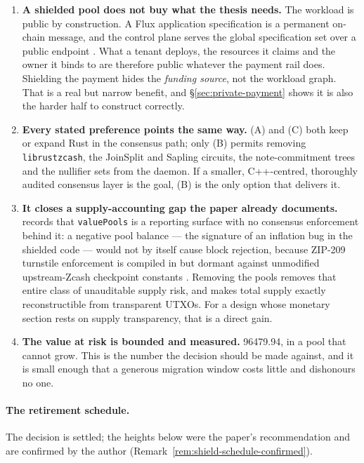 \begin{enumerate}
  \item \textbf{A shielded pool does not buy what the thesis needs.} The workload is public by
  construction. A Flux application specification is a permanent on-chain message, and the
  control plane serves the global specification set over a public endpoint
  . What a tenant deploys, the
  resources it claims and the owner it binds to are therefore public whatever the payment rail does.
  Shielding the payment hides the \emph{funding source}, not the workload graph. That is a real but
  narrow benefit, and \S\ref{sec:private-payment} shows it is also the harder half to construct
  correctly.
  \item \textbf{Every stated preference points the same way.} (A) and (C) both keep or expand Rust in
  the consensus path; only (B) permits removing \texttt{librustzcash}, the JoinSplit and Sapling
  circuits, the note-commitment trees and the nullifier sets from the daemon. If a smaller,
  C++-centred, thoroughly audited consensus layer is the goal, (B) is the only option that delivers
  it.
  \item \textbf{It closes a supply-accounting gap the paper already documents.}
   records that \texttt{valuePools} is a reporting surface with no
  consensus enforcement behind it: a negative pool balance --- the signature of an inflation bug in
  the shielded code --- would not by itself cause block rejection, because ZIP-209 turnstile
  enforcement is compiled in but dormant against unmodified upstream-Zcash checkpoint constants
  . Removing the pools removes that entire class of
  unauditable supply risk, and makes total supply exactly reconstructible from transparent UTXOs.
  For a design whose monetary section rests on supply transparency, that is a direct gain.
  \item \textbf{The value at risk is bounded and measured.} \num{96479.94}\flux, in a pool that
  cannot grow. This is the number the decision should be made against, and it is small enough that
  a generous migration window costs little and dishonours no one.
\end{enumerate}

\paragraph{The retirement schedule.} The decision is settled; the heights below were the paper's
recommendation and are confirmed by the author (Remark~\ref{rem:shield-schedule-confirmed}).

